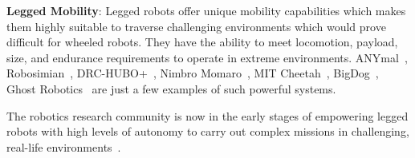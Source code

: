 \documentclass[letterpaper, 10pt, conference]{ieeeconf}      %
\newcommand{\ph}[1]{{\textbf{#1}:}} %
\newcommand{\rev}[1]{{\color{blue} #1 }} %
\begin{document}
\ph{Legged Mobility}
Legged robots offer unique mobility \rev{capabilities which makes them highly suitable to traverse challenging environments which would prove difficult for wheeled robots.}
They have the \rev{ability} to meet locomotion, payload, size, and endurance requirements \rev{to operate in extreme environments.} %
ANYmal~\cite{whyrobotdeepmines,Bellicoso2018}, Robosimian~\cite{Karumanchi2017}, DRC-HUBO+~\cite{jung2018development}, Nimbro Momaro~\cite{schwarz2017nimbro}, MIT Cheetah~\cite{mit_cheetah}, BigDog~\cite{bigdog}, Ghost Robotics~\cite{miller2019tunnel} are just a few examples of such powerful systems. 

\rev{The robotics research community is now in the early stages of empowering legged robots with high levels of autonomy to carry out complex missions in challenging, real-life environments~\cite{Delmerico2019}.}
\end{document}
